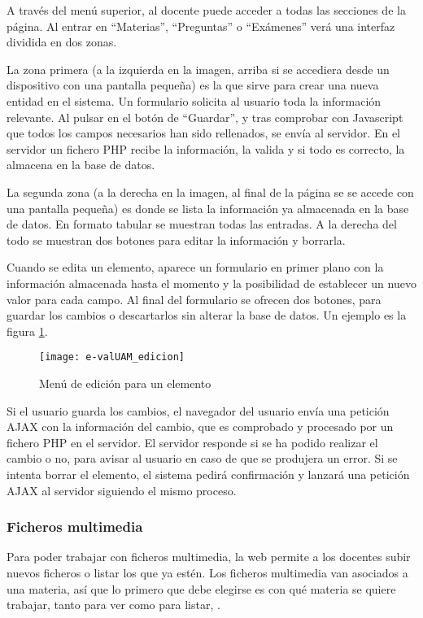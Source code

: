 A través del menú superior, al docente puede acceder a todas las secciones de la página. Al entrar en ``Materias'', ``Preguntas'' o ``Exámenes'' verá una interfaz dividida en dos zonas. 

La zona primera (a la izquierda en la imagen, arriba si se accediera desde un dispositivo con una pantalla pequeña) es la que sirve para crear una nueva entidad en el sistema. Un formulario solicita al usuario toda la información relevante. Al pulsar en el botón de ``Guardar'', y tras comprobar con Javascript que todos los campos necesarios han sido rellenados, se envía al servidor. En el servidor un fichero PHP recibe la información, la valida y si todo es correcto, la almacena en la base de datos.

La segunda zona (a la derecha en la imagen, al final de la página se se accede con una pantalla pequeña) es donde se lista la información ya almacenada en la base de datos. En formato tabular se muestran todas las entradas. A la derecha del todo se muestran dos botones para editar la información y borrarla.

Cuando se edita un elemento, aparece un formulario en primer plano con la información almacenada hasta el momento y la posibilidad de establecer un nuevo valor para cada campo. Al final del formulario se ofrecen dos botones, para guardar los cambios o descartarlos sin alterar la base de datos. Un ejemplo es la figura \ref{fig:e-valUAM edicion profesor}.

\begin{figure}[htp!]
	\centering
	\texttt{[image: e-valUAM\_edicion]}
	\caption{Menú de edición para un elemento}
	\label{fig:e-valUAM edicion profesor}
\end{figure}

Si el usuario guarda los cambios, el navegador del usuario envía una petición AJAX con la información del cambio, que es comprobado y procesado por un fichero PHP en el servidor. El servidor responde si se ha podido realizar el cambio o no, para avisar al usuario en caso de que se produjera un error. Si se intenta borrar el elemento, el sistema pedirá confirmación y lanzará una petición AJAX al servidor siguiendo el mismo proceso.

\subsubsection{Ficheros multimedia}

Para poder trabajar con ficheros multimedia, la web permite a los docentes subir nuevos ficheros o listar los que ya estén. Los ficheros multimedia van asociados a una materia, así que lo primero que debe elegirse es con qué materia se quiere trabajar, tanto para ver como para listar, .


